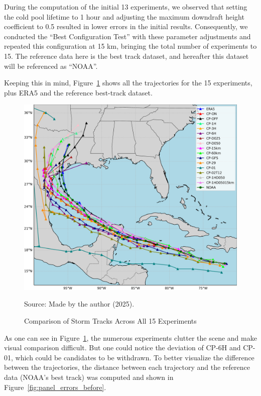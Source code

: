 During the computation of the initial 13 experiments, we observed that setting the cold pool lifetime to 1 hour and adjusting the maximum downdraft height coefficient to 0.5 resulted in lower errors in the initial results. Consequently, we conducted the “Best Configuration Test” with these parameter adjustments and repeated this configuration at 15 km, bringing the total number of experiments to 15. The reference data here is the best track dataset, and hereafter this dataset will be referenced as “NOAA”. 

Keeping this in mind, Figure~\ref{fig:all_tracks_before} shows all the trajectories for the 15 experiments, plus ERA5 and the reference best-track dataset.

\begin{figure}[!htb]
    \centering
    \caption{Comparison of Storm Tracks Across All 15 Experiments} %
    \includegraphics[width=\textwidth]{docs/figuras/findings/ALL_tracks.png} %
    \vspace{0.5em}
    
    Source: Made by the author (2025). %
    \label{fig:all_tracks_before} %
\end{figure}

As one can see in Figure~\ref{fig:all_tracks_before}, the numerous experiments clutter the scene and make visual comparison difficult. But one could notice the deviation of CP-6H and CP-01, which could be candidates to be withdrawn. To better visualize the difference between the trajectories, the distance between each trajectory and the reference data (NOAA’s best track) was computed and shown in Figure~\ref{fig:panel_errors_before}.

